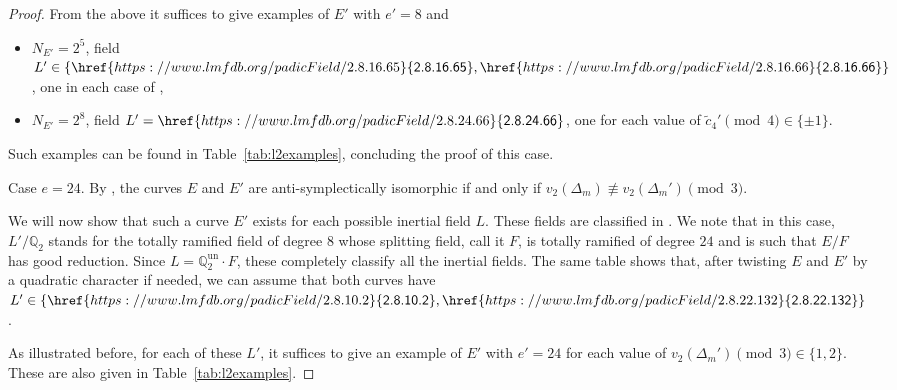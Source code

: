 \documentclass[12pt]{amsart}
\numberwithin{equation}{section}
\theoremstyle{definition}
\newcommand{\Q}{\mathbb{Q}}
\newcommand{\LMFDBL}[1]{\href{https://www.lmfdb.org/padicField/#1}{\textsf{#1}}}
\begin{document}
\begin{proof}
From the above it suffices to give examples of $E'$ with $e'=8$ and
\begin{itemize}
    \item[(A')]  $N_{E'}=2^5$, field $L'\in \{\LMFDBL{2.8.16.65}, \LMFDBL{2.8.16.66}\}$, one in each case of \cite[Table 3]{symplectic},
    \item[(B')] $N_{E'}=2^8$, field $L'=\LMFDBL{2.8.24.66}$, one for each value of $\tilde{c}_4'  \pmod 4\in \{\pm1\}$.
\end{itemize}
Such examples can be found in Table~\ref{tab:l2examples}, concluding the proof of this case.

{\sc Case $e=24$.} By \cite[Theorem 7]{symplectic}, the curves $E$ and $E'$ are anti-symplectically isomorphic if and only if $v_2(\Delta_m)\not\equiv v_2(\Delta_m') \pmod 3$.

We will now show that such a curve $E'$ exists for each possible inertial field $L$. These fields are classified in \cite[Table 17]{inertial}. We note that in this case, $L'/\Q_2$ stands for the totally ramified field of degree $8$ whose splitting field, call it $F$, is totally ramified of degree $24$ and is such that $E/F$ has good reduction. Since $L=\Q_2^{\text{un}}\cdot F$, these completely classify all the inertial fields. The same table shows that, after twisting $E$ and $E'$ by a quadratic character if needed, we can assume that both curves have $L'\in\{\LMFDBL{2.8.10.2}, \LMFDBL{2.8.22.132}\}$.

As illustrated before, for each of these $L'$, it suffices to give an example of $E'$ with $e'=24$ for each value of $v_2(\Delta_m') \pmod 3 \in\{1, 2\}$.
These are also given in Table~\ref{tab:l2examples}.
\end{proof}
\end{document}
